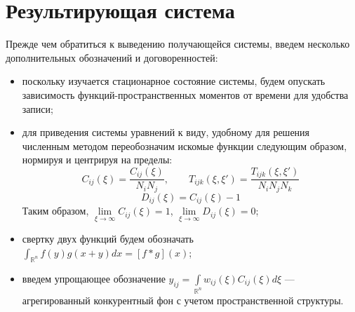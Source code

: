 \section{Результирующая система}
Прежде чем обратиться к выведению получающейся системы, введем несколько дополнительных обозначений и договоренностей:
\begin{itemize}
	\item поскольку изучается стационарное состояние системы, будем опускать зависимость функций-пространственных моментов от времени для удобства записи;
	
	\item для приведения системы уравнений к виду, удобному для решения численным методом переобозначим искомые функции следующим образом, нормируя и центрируя на пределы:
	\begin{equation*}
	C_{ij}(\xi)=\frac{C_{ij}(\xi)}{N_iN_j},
	\qquad
	 T_{ijk}(\xi, \xi')=\frac{T_{ijk}(\xi, \xi')}{N_iN_jN_k} 
	\end{equation*}
	\begin{equation*}
	D_{ij}(\xi)=C_{ij}(\xi)-1
	\end{equation*}
	Таким образом, $\lim\limits_{\xi \to \infty} C_{ij}(\xi)=1$, $\lim\limits_{\xi \to \infty} D_{ij}(\xi)=0$;
	\item свертку двух функций будем обозначать $\int_{\mathbb{R}^n} f(y)g(x+y)dx=[f*g](x)$;
	\item введем упрощающее обозначение $y_{ij}=\int\limits_{\mathbb{R}^n} w_{ij}(\xi)C_{ij}(\xi)d\xi$ --- агрегированный конкурентный фон с учетом пространственной структуры.
\end{itemize}

